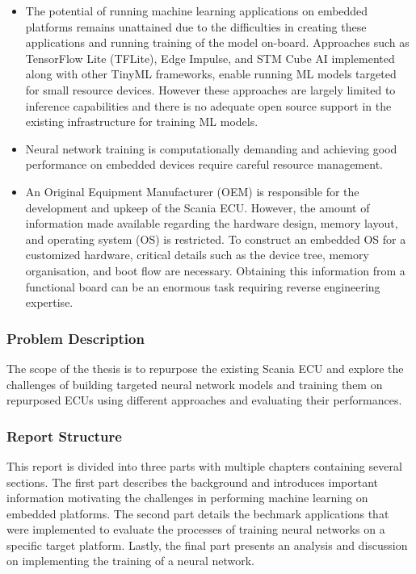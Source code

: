 \begin{itemize}
	\item The potential of running machine learning applications on embedded platforms remains unattained due to the difficulties in creating these applications and running training of the model on-board. Approaches such as TensorFlow Lite (TFLite), Edge Impulse, and STM Cube AI implemented along with other TinyML frameworks, enable running ML models targeted for small resource devices. However these approaches are largely limited to inference capabilities and there is no adequate open source support in the existing infrastructure for training ML models.
	\item Neural network training is computationally demanding and achieving good performance on embedded devices require careful resource management.
	\item An Original Equipment Manufacturer (OEM) is responsible for the development and upkeep of the Scania ECU. However, the amount of information made available regarding the hardware design, memory layout, and operating system (OS) is restricted. To construct an embedded OS for a customized hardware, critical details such as the device tree, memory organisation, and boot flow are necessary. Obtaining this information from a functional board can be an enormous task requiring reverse engineering expertise.
\end{itemize}


\subsubsection{Problem Description}

The scope of the thesis is to repurpose the existing Scania ECU and explore the challenges of building targeted neural network models and training them on repurposed ECUs using different approaches and evaluating their performances.

\subsubsection{Report Structure}

This report is divided into three parts with multiple chapters containing several sections. The first part describes the background and introduces important information motivating the challenges in performing machine learning on embedded platforms. The second part details the bechmark applications that were implemented to evaluate the processes of training neural networks on a specific target platform. Lastly, the final part presents an analysis and discussion on implementing the training of a neural network.

